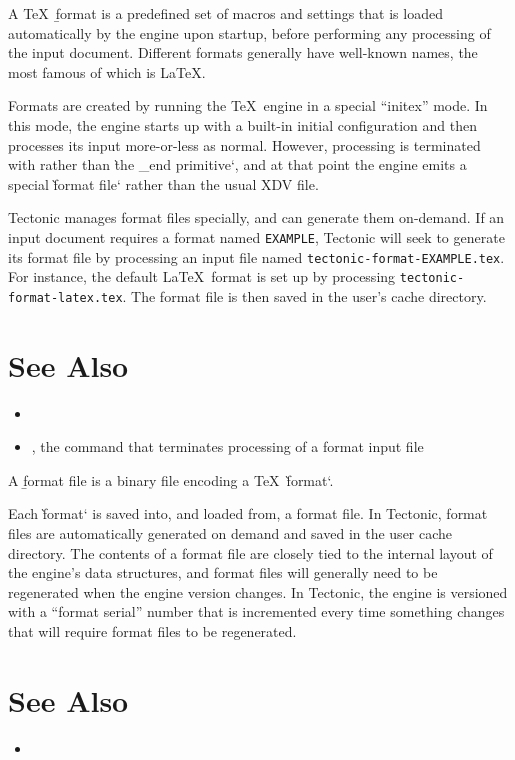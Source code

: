 
A \TeX\ \b{format} is a predefined set of macros and settings that is loaded
automatically by the engine upon startup, before performing any processing of
the input document. Different formats generally have well-known names, the most
famous of which is \LaTeX.

Formats are created by running the \TeX\ engine in a special “initex” mode. In
this mode, the engine starts up with a built-in initial configuration and then
processes its input more-or-less as normal. However, processing is terminated
with  rather than \`the _end primitive`, and at that point the engine
emits a special \`format file` rather than the usual XDV file.

Tectonic manages format files specially, and can generate them on-demand. If an
input document requires a format named \texttt{EXAMPLE}, Tectonic will seek to
generate its format file by processing an input file named
\texttt{tectonic-format-EXAMPLE.tex}. For instance, the default \LaTeX\ format
is set up by processing \texttt{tectonic-format-latex.tex}. The format file is
then saved in the user's cache directory.

\section*{See Also}

\begin{itemize}
\item {}
\item {}, the command that terminates processing of a format input file
\end{itemize}

\tduxEmit



A \b{format file} is a binary file encoding a \TeX\ \`format`.

Each \`format` is saved into, and loaded from, a format file. In Tectonic,
format files are automatically generated on demand and saved in the user cache
directory. The contents of a format file are closely tied to the internal layout
of the engine's data structures, and format files will generally need to be
regenerated when the engine version changes. In Tectonic, the engine is
versioned with a “format serial” number that is incremented every time something
changes that will require format files to be regenerated.

\section*{See Also}

\begin{itemize}
\item {}
\end{itemize}
